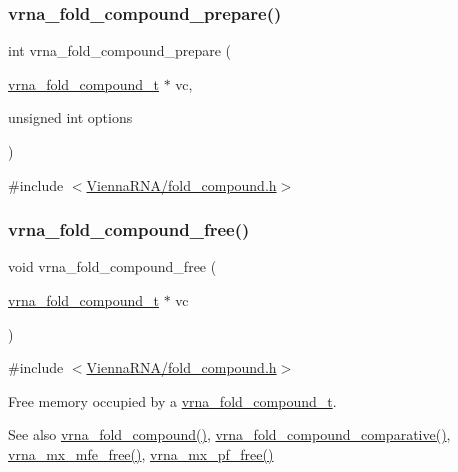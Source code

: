 \subsubsection{\texorpdfstring{vrna\+\_\+fold\+\_\+compound\+\_\+prepare()}{vrna\_fold\_compound\_prepare()}}
{\footnotesize\ttfamily int vrna\+\_\+fold\+\_\+compound\+\_\+prepare (\begin{DoxyParamCaption}\item[{\mbox{\hyperlink{group__fold__compound_ga1b0cef17fd40466cef5968eaeeff6166}{vrna\+\_\+fold\+\_\+compound\+\_\+t}} $\ast$}]{vc,  }\item[{unsigned int}]{options }\end{DoxyParamCaption})}



{\ttfamily \#include $<$\mbox{\hyperlink{fold__compound_8h}{Vienna\+R\+N\+A/fold\+\_\+compound.\+h}}$>$}

\mbox{\label{group__fold__compound_gadded6039d63f5d6509836e20321534ad}} 
\subsubsection{\texorpdfstring{vrna\+\_\+fold\+\_\+compound\+\_\+free()}{vrna\_fold\_compound\_free()}}
{\footnotesize\ttfamily void vrna\+\_\+fold\+\_\+compound\+\_\+free (\begin{DoxyParamCaption}\item[{\mbox{\hyperlink{group__fold__compound_ga1b0cef17fd40466cef5968eaeeff6166}{vrna\+\_\+fold\+\_\+compound\+\_\+t}} $\ast$}]{vc }\end{DoxyParamCaption})}



{\ttfamily \#include $<$\mbox{\hyperlink{fold__compound_8h}{Vienna\+R\+N\+A/fold\+\_\+compound.\+h}}$>$}



Free memory occupied by a \mbox{\hyperlink{group__fold__compound_ga1b0cef17fd40466cef5968eaeeff6166}{vrna\+\_\+fold\+\_\+compound\+\_\+t}}. 

\begin{DoxySeeAlso}{See also}
\mbox{\hyperlink{group__fold__compound_ga6601d994ba32b11511b36f68b08403be}{vrna\+\_\+fold\+\_\+compound()}}, \mbox{\hyperlink{group__fold__compound_gad6bacc816af274922b13d947f708aa0c}{vrna\+\_\+fold\+\_\+compound\+\_\+comparative()}}, \mbox{\hyperlink{group__dp__matrices_ga6a9422feb5dfe5c64050cebf447672d0}{vrna\+\_\+mx\+\_\+mfe\+\_\+free()}}, \mbox{\hyperlink{group__dp__matrices_ga2283e69fd139fb8e58d7ade3b5773f9c}{vrna\+\_\+mx\+\_\+pf\+\_\+free()}}
\end{DoxySeeAlso}

